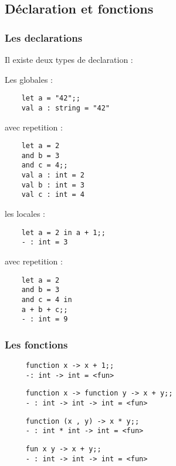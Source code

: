 \subsection{Déclaration et fonctions} %
\begin{frame}[fragile]
      \frametitle{Les declarations}
      Il existe deux types de declaration :
     \begin{minipage}[t]{5cm}
	Les globales :\\
	\begin{lstlisting}
	let a = "42";;
	val a : string = "42"
	\end{lstlisting}
	avec repetition :
	\begin{lstlisting}
	let a = 2
	and b = 3
	and c = 4;;
	val a : int = 2
	val b : int = 3
	val c : int = 4
	\end{lstlisting}
      \end{minipage}
      \begin{minipage}[t]{5cm}
	les locales :\\
	\begin{lstlisting}
	let a = 2 in a + 1;;
	- : int = 3
	\end{lstlisting}
	avec repetition :
	\begin{lstlisting}
	let a = 2
	and b = 3
	and c = 4 in
	a + b + c;;
	- : int = 9
	\end{lstlisting}
      \end{minipage}
\end{frame}

\begin{frame}[fragile]
	\frametitle{Les fonctions}
	\begin{center}
		\begin{minipage}{10cm}
				\begin{lstlisting}
     function x -> x + 1;;
     -: int -> int = <fun>
				\end{lstlisting}
				\begin{lstlisting}
     function x -> function y -> x + y;;
     - : int -> int -> int = <fun>
				\end{lstlisting}
				\begin{lstlisting}
     function (x , y) -> x * y;;
     - : int * int -> int = <fun>
				\end{lstlisting}
				\begin{lstlisting}
     fun x y -> x + y;;
     - : int -> int -> int = <fun>
				\end{lstlisting}
		\end{minipage}
  \end{center}
\end{frame}

